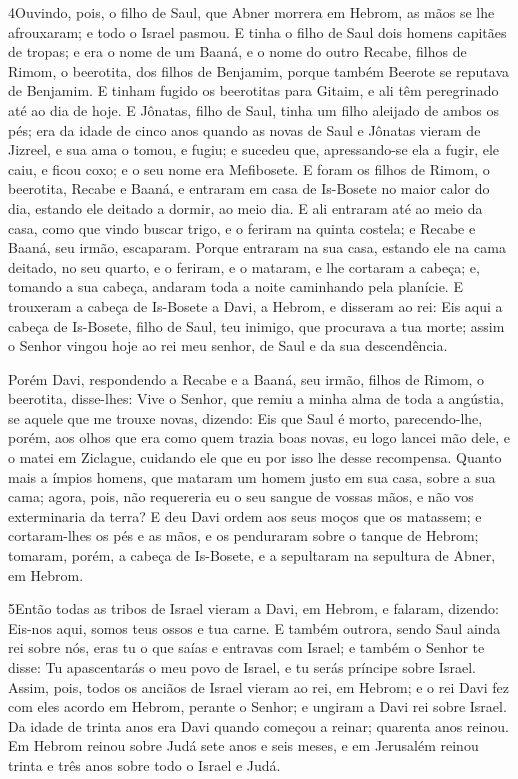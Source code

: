 \medskip

\lettrine{4} Ouvindo, pois, o filho de Saul, que Abner morrera
em Hebrom, as mãos se lhe afrouxaram; e todo o Israel pasmou. E
tinha o filho de Saul dois homens capitães de tropas; e era o nome
de um Baaná, e o nome do outro Recabe, filhos de Rimom, o beerotita,
dos filhos de Benjamim, porque também Beerote se reputava de
Benjamim. E tinham fugido os beerotitas para Gitaim, e ali têm
peregrinado até ao dia de hoje. E Jônatas, filho de Saul, tinha
um filho aleijado de ambos os pés; era da idade de cinco anos quando
as novas de Saul e Jônatas vieram de Jizreel, e sua ama o tomou, e
fugiu; e sucedeu que, apressando-se ela a fugir, ele caiu, e ficou
coxo; e o seu nome era Mefibosete. E foram os filhos de Rimom, o
beerotita, Recabe e Baaná, e entraram em casa de Is-Bosete no maior
calor do dia, estando ele deitado a dormir, ao meio dia. E ali
entraram até ao meio da casa, como que vindo buscar trigo, e o
feriram na quinta costela; e Recabe e Baaná, seu irmão, escaparam.
Porque entraram na sua casa, estando ele na cama deitado, no seu
quarto, e o feriram, e o mataram, e lhe cortaram a cabeça; e,
tomando a sua cabeça, andaram toda a noite caminhando pela planície.
E trouxeram a cabeça de Is-Bosete a Davi, a Hebrom, e disseram
ao rei: Eis aqui a cabeça de Is-Bosete, filho de Saul, teu inimigo,
que procurava a tua morte; assim o Senhor vingou hoje ao rei meu
senhor, de Saul e da sua descendência.

Porém Davi, respondendo a Recabe e a Baaná, seu irmão, filhos de
Rimom, o beerotita, disse-lhes: Vive o Senhor, que remiu a minha
alma de toda a angústia, se aquele que me trouxe novas,
dizendo: Eis que Saul é morto, parecendo-lhe, porém, aos olhos que
era como quem trazia boas novas, eu logo lancei mão dele, e o matei
em Ziclague, cuidando ele que eu por isso lhe desse recompensa.
Quanto mais a ímpios homens, que mataram um homem justo em
sua casa, sobre a sua cama; agora, pois, não requereria eu o seu
sangue de vossas mãos, e não vos exterminaria da terra? E deu
Davi ordem aos seus moços que os matassem; e cortaram-lhes os pés e
as mãos, e os penduraram sobre o tanque de Hebrom; tomaram, porém, a
cabeça de Is-Bosete, e a sepultaram na sepultura de Abner, em
Hebrom.

\medskip

\lettrine{5} Então todas as tribos de Israel vieram a Davi, em
Hebrom, e falaram, dizendo: Eis-nos aqui, somos teus ossos e tua
carne. E também outrora, sendo Saul ainda rei sobre nós, eras tu
o que saías e entravas com Israel; e também o Senhor te disse: Tu
apascentarás o meu povo de Israel, e tu serás príncipe sobre Israel.
Assim, pois, todos os anciãos de Israel vieram ao rei, em
Hebrom; e o rei Davi fez com eles acordo em Hebrom, perante o
Senhor; e ungiram a Davi rei sobre Israel. Da idade de trinta
anos era Davi quando começou a reinar; quarenta anos reinou. Em
Hebrom reinou sobre Judá sete anos e seis meses, e em Jerusalém
reinou trinta e três anos sobre todo o Israel e Judá.


